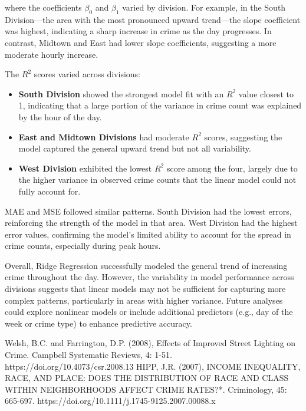 \documentclass{report}
\begin{document}
    where the coefficients $\beta_0$ and $\beta_1$ varied by division. For example, in the South Division—the area with the most pronounced upward trend—the slope coefficient was highest, indicating a sharp increase in crime as the day progresses. In contrast, Midtown and East had lower slope coefficients, suggesting a more moderate hourly increase.
    
    The $R^2$ scores varied across divisions:
    \begin{itemize}
    	\item \textbf{South Division} showed the strongest model fit with an $R^2$ value closest to 1, indicating that a large portion of the variance in crime count was explained by the hour of the day.
    	\item \textbf{East and Midtown Divisions} had moderate $R^2$ scores, suggesting the model captured the general upward trend but not all variability.
    	\item \textbf{West Division} exhibited the lowest $R^2$ score among the four, largely due to the higher variance in observed crime counts that the linear model could not fully account for.
    \end{itemize}
    
    MAE and MSE followed similar patterns. South Division had the lowest errors, reinforcing the strength of the model in that area. West Division had the highest error values, confirming the model's limited ability to account for the spread in crime counts, especially during peak hours.
    
    Overall, Ridge Regression successfully modeled the general trend of increasing crime throughout the day. However, the variability in model performance across divisions suggests that linear models may not be sufficient for capturing more complex patterns, particularly in areas with higher variance. Future analyses could explore nonlinear models or include additional predictors (e.g., day of the week or crime type) to enhance predictive accuracy.


    
       
 
	
	\begin{thebibliography}{9}
			Welsh, B.C. and Farrington, D.P. (2008), Effects of Improved Street Lighting on Crime. Campbell Systematic Reviews, 4: 1-51. https://doi.org/10.4073/csr.2008.13
			HIPP, J.R. (2007), INCOME INEQUALITY, RACE, AND PLACE: DOES THE DISTRIBUTION OF RACE AND CLASS WITHIN NEIGHBORHOODS AFFECT CRIME RATES?*. Criminology, 45: 665-697. https://doi.org/10.1111/j.1745-9125.2007.00088.x
	\end{thebibliography}
	
\end{document}
